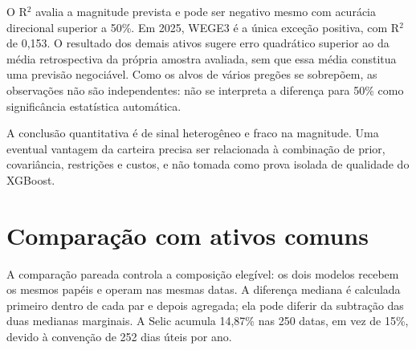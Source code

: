 O R$^{2}$ avalia a magnitude prevista e pode ser negativo mesmo com acurácia direcional superior a 50\%. Em 2025, WEGE3 é a única exceção positiva, com R$^{2}$ de 0,153. O resultado dos demais ativos sugere erro quadrático superior ao da média retrospectiva da própria amostra avaliada, sem que essa média constitua uma previsão negociável. Como os alvos de vários pregões se sobrepõem, as observações não são independentes: não se interpreta a diferença para 50\% como significância estatística automática.

A conclusão quantitativa é de sinal heterogêneo e fraco na magnitude. Uma eventual vantagem da carteira precisa ser relacionada à combinação de prior, covariância, restrições e custos, e não tomada como prova isolada de qualidade do XGBoost.

\clearpage
\section{Comparação com ativos comuns}
A comparação pareada controla a composição elegível: os dois modelos recebem os mesmos papéis e operam nas mesmas datas. A diferença mediana é calculada primeiro dentro de cada par e depois agregada; ela pode diferir da subtração das duas medianas marginais. A Selic acumula 14,87\% nas 250 datas, em vez de 15\%, devido à convenção de 252 dias úteis por ano.

